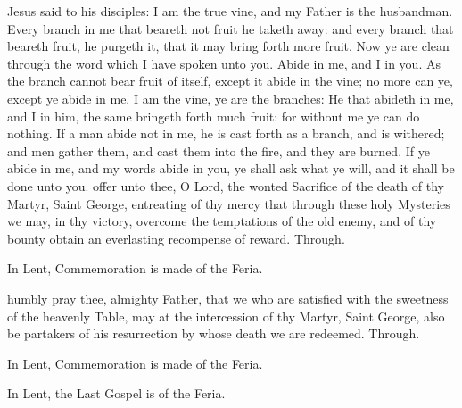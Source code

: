  Jesus said to his disciples: I am the true vine, and my Father is the husbandman. Every branch in me that beareth not fruit he taketh away: and every branch that beareth fruit, he purgeth it, that it may bring forth more fruit. Now ye are clean through the word which I have spoken unto you. Abide in me, and I in you. As the branch cannot bear fruit of itself, except it abide in the vine; no more can ye, except ye abide in me. I am the vine, ye are the branches: He that abideth in me, and I in him, the same bringeth forth much fruit: for without me ye can do nothing. If a man abide not in me, he is cast forth as a branch, and is withered; and men gather them, and cast them into the fire, and they are burned. If ye abide in me, and my words abide in you, ye shall ask what ye will, and it shall be done unto you.
\secret
{} offer unto thee, O Lord, the wonted Sacrifice of the death of thy Martyr, Saint George, entreating of thy mercy that through these holy Mysteries we may, in thy victory, overcome the temptations of the old enemy, and of thy bounty obtain an everlasting recompense of reward. Through.
\begin{rubric}
    In Lent, Commemoration is made of the Feria.%
\end{rubric}
\vspace{-1.5ex}
\vspace{-1.5ex}
\postcommunion
{} humbly pray thee, almighty Father, that we who are satisfied with the sweetness of the heavenly Table, may at the intercession of thy Martyr, Saint George, also be partakers of his resurrection by whose death we are redeemed. Through.
\begin{rubric}
    In Lent, Commemoration is made of the Feria.%
\end{rubric}
\begin{rubric}
    In Lent, the Last Gospel is of the Feria.%
\end{rubric}

